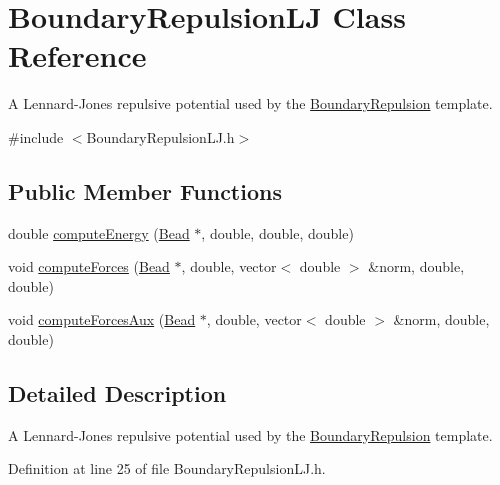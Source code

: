 \hypertarget{classBoundaryRepulsionLJ}{\section{Boundary\+Repulsion\+L\+J Class Reference}
\label{classBoundaryRepulsionLJ}
}


A Lennard-\/\+Jones repulsive potential used by the \hyperlink{classBoundaryRepulsion}{Boundary\+Repulsion} template.  




{\ttfamily \#include $<$Boundary\+Repulsion\+L\+J.\+h$>$}

\subsection*{Public Member Functions}
\begin{DoxyCompactItemize}
\item 
double \hyperlink{classBoundaryRepulsionLJ_ae2ed4a186c5f751e4f712bc527e745ac}{compute\+Energy} (\hyperlink{classBead}{Bead} $\ast$, double, double, double)
\item 
void \hyperlink{classBoundaryRepulsionLJ_a0b0e10016d0bbb787bd250c7b06285d1}{compute\+Forces} (\hyperlink{classBead}{Bead} $\ast$, double, vector$<$ double $>$ \&norm, double, double)
\item 
void \hyperlink{classBoundaryRepulsionLJ_a0cf407047ab1f4e601c6838919242566}{compute\+Forces\+Aux} (\hyperlink{classBead}{Bead} $\ast$, double, vector$<$ double $>$ \&norm, double, double)
\end{DoxyCompactItemize}


\subsection{Detailed Description}
A Lennard-\/\+Jones repulsive potential used by the \hyperlink{classBoundaryRepulsion}{Boundary\+Repulsion} template. 

Definition at line 25 of file Boundary\+Repulsion\+L\+J.\+h.



